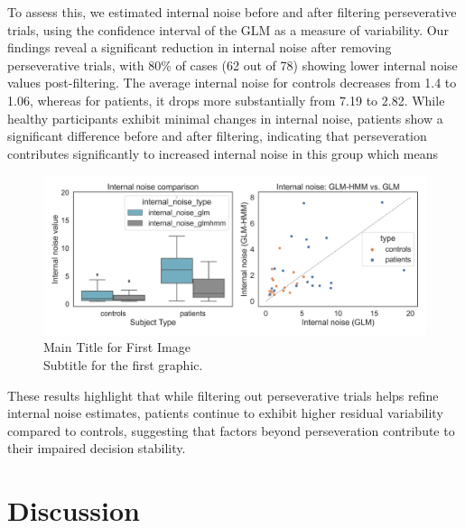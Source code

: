 To assess this, we estimated internal noise before and after filtering perseverative trials, using the confidence interval of the GLM as a measure of variability. Our findings reveal a significant reduction in internal noise after removing perseverative trials, with 80\% of cases (62 out of 78) showing lower internal noise values post-filtering. The average internal noise for controls decreases from 1.4 to 1.06, whereas for patients, it drops more substantially from 7.19 to 2.82. While healthy participants exhibit minimal changes in internal noise, patients show a significant difference before and after filtering, indicating that perseveration contributes significantly to increased internal noise in this group which means 
\begin{figure}[H]
    \centering
    \includegraphics[width=16cm]{MainLayout/Images/chapter7/in_glm_comparison.jpg}
    \caption{Main Title for First Image \\ \small Subtitle for the first graphic.}
    \label{fig:in_glm_comparison}
\end{figure}

These results highlight that while filtering out perseverative trials helps refine internal noise estimates, patients continue to exhibit higher residual variability compared to controls, suggesting that factors beyond perseveration contribute to their impaired decision stability.


\section{Discussion}